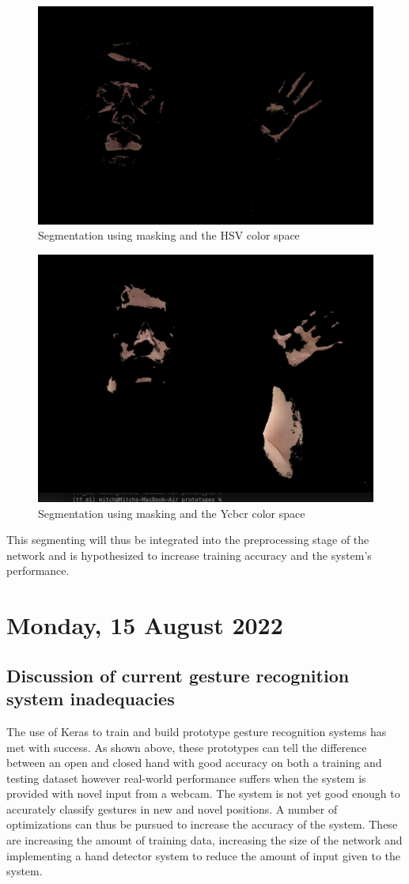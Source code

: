 \begin{figure}[h]
    \centering
    \includegraphics[width=0.6\linewidth]{figures/hsv_segmentation_fast.png}
    \caption{Segmentation using masking and the HSV color space}
    \label{fig:hsv_segmentation_fast}
\end{figure}

\begin{figure}[h]
    \centering
    \includegraphics[width=0.6\linewidth]{figures/ycbcr_segmentation_fast.png}
    \caption{Segmentation using masking and the Ycbcr color space}
    \label{fig:ycbcr_segmentation_fast}
\end{figure}

This segmenting will thus be integrated into the preprocessing stage of the network and is hypothesized to increase training accuracy and the system's performance.

\section[2022/08/15]{Monday, 15 August 2022}

\subsection{Discussion of current gesture recognition system inadequacies}

The use of Keras to train and build prototype gesture recognition systems has met with success. As shown above, these prototypes can tell the difference between an open and closed hand with good accuracy on both a training and testing dataset however real-world performance suffers when the system is provided with novel input from a webcam. The system is not yet good enough to accurately classify gestures in new and novel positions. A number of optimizations can thus be pursued to increase the accuracy of the system. These are increasing the amount of training data, increasing the size of the network and implementing a hand detector system to reduce the amount of input given to the system. \\

